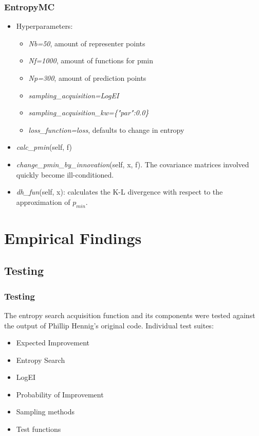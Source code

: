 \documentclass[10pt,handout]{beamer}
\begin{document}
\begin{frame}
\frametitle{EntropyMC}
\begin{itemize}
\item Hyperparameters:
\begin{itemize}
\item \emph{Nb=50}, amount of representer points 
\item \emph{Nf=1000}, amount of functions for pmin
\item \emph{Np=300}, amount of prediction points
\item \emph{sampling\_acquisition=LogEI} 
\item \emph{sampling\_acquisition\_kw=\{"par":0.0\}}
\item \emph{loss\_function=loss}, defaults to change in entropy
\end{itemize}
  \item \emph{calc\_pmin}(self, f)
  \item \emph{change\_pmin\_by\_innovation}(self, x, f). The covariance matrices
  involved quickly become ill-conditioned.
  \item \emph{dh\_fun}(self, x): calculates the K-L divergence with respect to
  the approximation of $p_{min}$.
\end{itemize}
\end{frame}


\section{Empirical Findings}

\subsection{Testing}
\begin{frame}
\frametitle{Testing}

The entropy search acquisition function and its components were tested
against the output of Phillip Hennig's original code. Individual test suites:

\begin{itemize}
  \item Expected Improvement
  \item Entropy Search
  \item LogEI
  \item Probability of Improvement
  \item Sampling methods
  \item Test functions
\end{itemize}
\end{frame}
\end{document}
